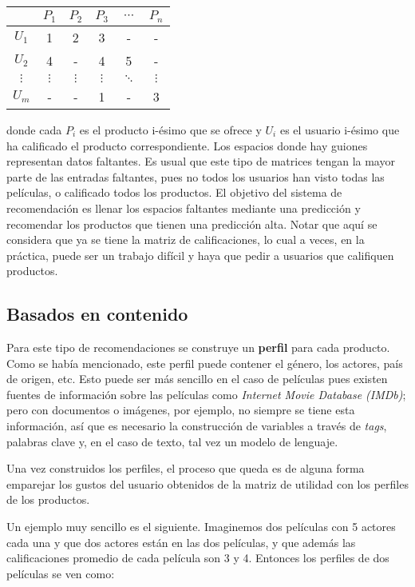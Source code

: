 \begin{center}
\begin{tabular}{ c | c  c c c c}
    & $P_1$ & $P_2$ & $P_3$ & $\cdots$ & $P_n$ \\
  \hline                       
  $U_1$ & 1 & 2 & 3 & - & - \\
  $U_2$ & 4 & - & 4 & 5  & -\\
  $\vdots$ & $\vdots$ & $\vdots$ & $\vdots$ & $\ddots$ & $\vdots$\\
  $U_m$ & - & - & 1 & - & 3\\
  \hline  
\end{tabular}
\end{center}


donde cada $P_i$ es el producto i-ésimo que se ofrece y $U_i$ es el usuario i-ésimo que ha calificado el producto correspondiente. Los espacios donde hay guiones representan datos faltantes. Es usual que este tipo de matrices tengan la mayor parte de las entradas faltantes, pues no todos los usuarios han visto todas las películas, o calificado todos los productos. El objetivo del sistema de recomendación es llenar los espacios faltantes mediante una predicción y recomendar los productos que tienen una predicción alta. Notar que aquí se considera que ya se tiene la matriz de calificaciones, lo cual a veces, en la práctica, puede ser un trabajo difícil y haya que pedir a usuarios que califiquen productos.

\subsection{Basados en contenido}

Para este tipo de recomendaciones se construye un \textbf{perfil} para cada producto. Como se había mencionado, este perfil puede contener el género, los actores, país de origen, etc. Esto puede ser más sencillo en el caso de películas pues existen fuentes de información sobre las películas como \textit{Internet Movie Database (IMDb)}; pero con documentos o imágenes, por ejemplo, no siempre se tiene esta información, así que es necesario la construcción de variables a través de \textit{tags}, palabras clave y, en el caso de texto, tal vez un modelo de lenguaje.

Una vez construidos los perfiles, el proceso que queda es de alguna forma emparejar los gustos del usuario obtenidos de la matriz de utilidad con los perfiles de los productos.

Un ejemplo muy sencillo es el siguiente. Imaginemos dos películas con 5 actores cada una y que dos actores están en las dos películas, y que además las calificaciones promedio de cada película son 3 y 4. Entonces los perfiles de dos películas se ven como:

